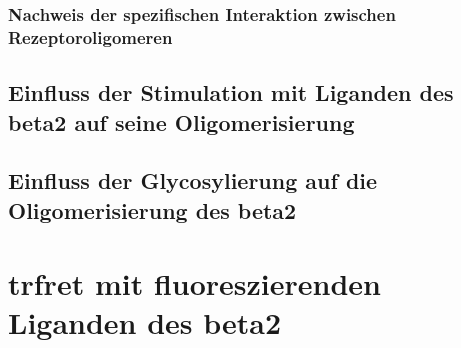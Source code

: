 \subsubsection{Nachweis der spezifischen Interaktion zwischen Rezeptoroligomeren}

\subsection{Einfluss der Stimulation mit Liganden des \gls{beta2} auf seine Oligomerisierung}

\subsection{Einfluss der Glycosylierung auf die Oligomerisierung des \gls{beta2}}

\section{\gls{trfret} mit fluoreszierenden Liganden des \gls{beta2}}
\label{ligandenfret}

